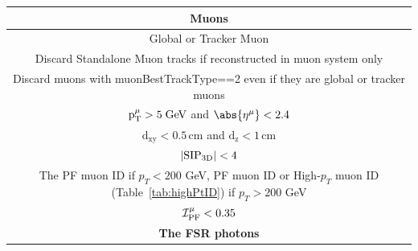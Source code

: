 \begin{itemize}
\begin{table}[H]
\begin{tabular}{|c|c|}
                \hline \hline
		\multicolumn{2}{|c|}{\textbf{Muons}}  \\ \hline
                \multicolumn{2}{|c|}{Global or Tracker Muon} \\
                \multicolumn{2}{|c|}{Discard Standalone Muon tracks if reconstructed in muon system only} \\
                \multicolumn{2}{|c|}{Discard muons with muonBestTrackType==2 even if they are global or tracker muons} \\
		\multicolumn{2}{|c|}{$\mathrm{p_T^{\mu}} > 5 \hbox{$\;\hbox{\rm GeV}$}$ \hspace{0.5cm} and \hspace{0.5cm} $\abs{\eta^{\mu}} < 2.4$}                                                                                                                                       \\
		\multicolumn{2}{|c|}{$\mathrm{d_{xy}} < 0.5 \, \mathrm{cm}$ \hspace{0.5cm} and \hspace{0.5cm} $\mathrm{d_{z}} < 1 \, \mathrm{cm}$}                                                                                                                           \\
		\multicolumn{2}{|c|}{$| {\rm SIP_{3D}} | < 4$  }                                                                                                                                                                                   \\
		\multicolumn{2}{|c|}{The PF muon ID if $p_T<200$  GeV, PF muon ID or High-$p_T$ muon ID (Table~\ref{tab:highPtID}) if $p_T>200$ GeV}                                                                                                                                                 \\
		\multicolumn{2}{|c|}{$\ensuremath{{\cal I}_{\mathrm{PF}}^{\mu}} < 0.35$}                                                                                                                                           \\ \hline \hline
		\multicolumn{2}{|c|}{\textbf{The FSR photons}}                                                                                                                                                                                  \\ \hline

\end{tabular}
\end{table}
\end{itemize}
